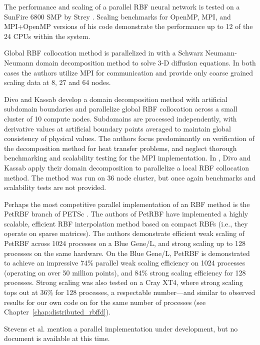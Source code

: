 \documentclass[11pt]{report}
\begin{document}
The performance and scaling of a parallel RBF neural network is tested on a SunFire 6800 SMP by Strey \cite{Strey2003}. Scaling benchmarks for OpenMP, MPI, and MPI+OpenMP versions of his code demonstrate the performance up to 12 of the 24 CPUs within the system.

Global RBF collocation method is parallelized in \cite{Ingber2003,Ingber2004} with a Schwarz Neumann-Neumann domain decomposition method to solve 3-D diffusion equations. In both cases the authors utilize MPI for communication and provide only coarse grained scaling data at 8, 27 and 64 nodes. 
 
 
Divo and Kassab \cite{Divo2005} develop a domain decomposition method with artificial 
subdomain boundaries and parallelize global RBF collocation across a small cluster of 10 compute nodes. Subdomains are processed independently, with derivative values 
at artificial boundary points averaged to maintain global consistency of physical values. The authors focus predominantly on verification of the decomposition method for heat transfer problems, and neglect thorough benchmarking and scalability testing for the MPI implementation. In \cite{Divo2007}, Divo and Kassab apply their domain decomposition to parallelize a local RBF collocation method. The method
was run on 36 node cluster, but once again benchmarks and scalability tests are not provided. 


Perhaps the most competitive parallel implementation of an RBF method is the PetRBF branch of PETSc \cite{Yokota2010}. The authors of PetRBF have implemented a highly scalable, efficient RBF interpolation method based on compact RBFs (i.e., they operate on sparse matrices). The authors demonstrate efficient weak scaling of PetRBF across 1024 processes on a Blue Gene/L, and strong scaling up to 128 processes on the same hardware. On the Blue Gene/L, PetRBF is demonstrated to achieve an impressive 74\% parallel weak scaling efficiency on 1024 processes (operating on over 50 million points), and 84\% strong scaling efficiency for 128 processes. Strong scaling was also tested on a Cray XT4, where strong scaling tops out at 36\% for 128 processes, a respectable number---and similar to observed results for our own code on for the same number of processes (see Chapter~\ref{chap:distributed_rbffd}).  


Stevens et al. \cite{Stevens2009a} mention a parallel implementation under development, but no document is available at this time. 
\end{document}
